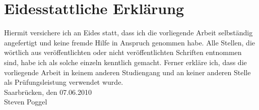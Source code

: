 
\maketitle\thispagestyle{empty}
\setcounter{page}{0}\clearpage

%

\pagestyle{empty}%


\tableofcontents


%



%

%


\chapter*{Eidesstattliche Erklärung}
\label{chap:EidesstattlicheErklaerung}

Hiermit versichere ich an Eides statt, dass ich die vorliegende Arbeit 
selbständig angefertigt und keine fremde Hilfe in Anspruch genommen habe. 
Alle Stellen, die wörtlich aus veröffentlichten oder nicht veröffentlichten 
Schriften entnommen sind, habe ich als solche einzeln kenntlich gemacht. 
Ferner erkläre ich, dass die vorliegende Arbeit in keinem anderen Studiengang und
an keiner anderen Stelle als Prüfungsleistung verwendet wurde.
\\
Saarbrücken, den 07.06.2010 \\
Steven Poggel
